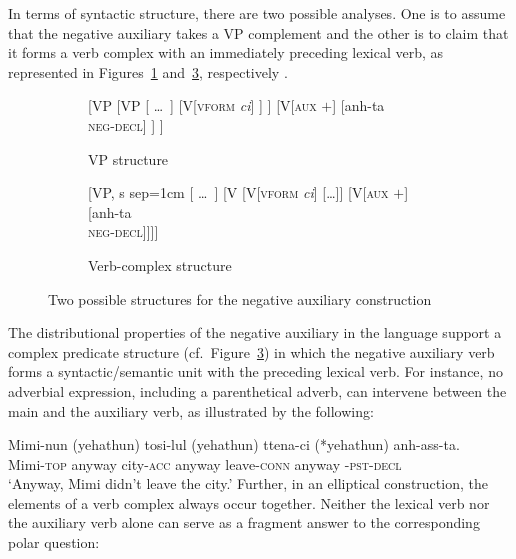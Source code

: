 \documentclass[output=paper
 	        ,biblatex
                ,babelshorthands
                ,newtxmath
                ,draftmode
                ,colorlinks, citecolor=brown
]{langscibook}
\begin{document}
\begin{exe}
\begin{xlist}
\begin{exe}
\begin{xlist}
In terms of syntactic structure, there
are two possible analyses.  One is to assume that the negative auxiliary takes a VP complement and the other is to claim that it forms a verb complex with
an immediately preceding lexical verb, as represented in Figures~\ref{negation-fig:3a} and~\ref{negation-fig:3b}, respectively
\citep{Chung98a-u, Kim:16}.
%
\begin{figure}
	\begin{subfigure}[b]{0.48\textwidth}
\centering
		\begin{forest}
			[VP
				[VP
					[ \dots\ ]
					[V{[\textsc{vform} \textit{ci}]}
					]
					]
				[V{[\textsc{aux $+$}]}
					[anh-ta\\ \textsc{neg-decl}]
				]
			]	
		\end{forest}
	\caption{VP structure}\label{negation-fig:3a}
		\end{subfigure}	
\hfill
	\begin{subfigure}[b]{0.48\textwidth}
\centering
		\begin{forest}
			[VP, s sep=1cm
				[ \dots\ ]
				[V
					[V{[\textsc{vform} \textit{ci}]}
						[\dots]]
					[V{[\textsc{aux $+$}]}
						[anh-ta\\ \textsc{neg-decl}]]]]
		\end{forest}
	\caption{Verb-complex structure}\label{negation-fig:3b}	
		\end{subfigure}
	\caption{Two possible structures for the negative auxiliary construction}
\end{figure}

The distributional properties of the negative auxiliary in the language support
 a complex predicate structure (cf.\ Figure~\ref{negation-fig:3b}) in which the negative auxiliary verb
forms a syntactic/semantic unit with the preceding lexical verb.
For instance, no adverbial expression, including
a parenthetical adverb, can intervene between
the main and the auxiliary verb, as illustrated by the
following:

\ea
\gll Mimi-nun          (yehathun)           tosi-lul          (yehathun)           ttena-ci            (*yehathun) anh-ass-ta. \\
     Mimi-\textsc{top} \hphantom{(}anyway city-\textsc{acc} \hphantom{(}anyway leave-\textsc{conn} \hphantom{(*}anyway \NEG-\textsc{pst}-\textsc{decl} \\\hfill{}
\glt `Anyway, Mimi didn't leave the city.'
\z
%
Further, in an elliptical construction, the elements of a verb complex
 always occur together. Neither the lexical  verb  nor the
 auxiliary verb alone  can serve
as a fragment answer to the corresponding polar question:


\end{xlist}
\end{exe}
\end{xlist}
\end{exe}
\end{document}
